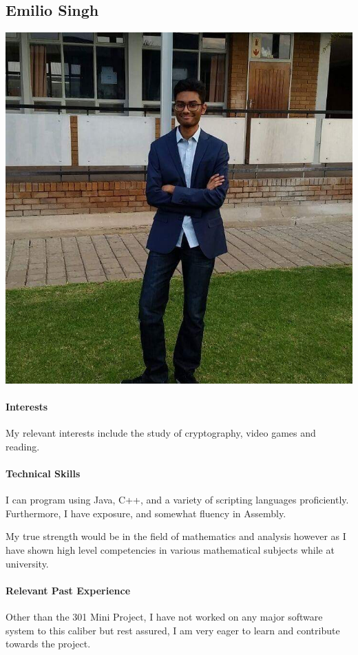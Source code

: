 \documentclass[12pt]{article}
\begin{document}
\subsection{Emilio Singh}
\includegraphics[scale=0.2]{Emilio}
\paragraph{Interests}
My relevant interests include the study of cryptography, video games and reading.
\paragraph{Technical Skills}
I can program using Java, C++, and a variety of scripting languages proficiently.
Furthermore, I have exposure, and somewhat fluency in Assembly.

My true strength would be in the field of mathematics and analysis however as I have shown high level competencies in various mathematical subjects while at university.
\paragraph{Relevant Past Experience}
Other than the 301 Mini Project, I have not worked on any major software system to this caliber but rest assured, I am very eager to learn and contribute towards the project.
\end{document}
